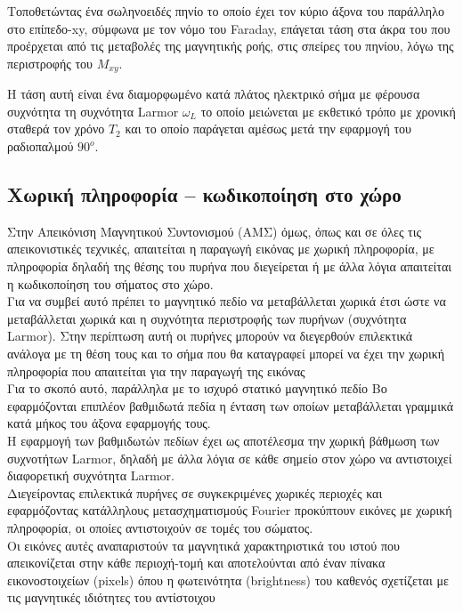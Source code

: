 \documentclass{article}
\begin{document}
    Τοποθετώντας	 ένα	 σωληνοειδές	 πηνίο	 το	 οποίο	 έχει	 τον	 κύριο	 άξονα	 του	
παράλληλο	 στο	 επίπεδο-xy,	 	 σύμφωνα	 με	 τον	 νόμο	 του	 Faraday,	 επάγεται	
τάση	στα	άκρα	 του	που	προέρχεται	από	 τις	μεταβολές	 της	μαγνητικής	 ροής,	
στις	σπείρες	του	πηνίου,	λόγω	της	περιστροφής	του	$M_{xy}$.

Η	 τάση	 αυτή	 είναι	 ένα	 διαμορφωμένο	 κατά	 πλάτος	 ηλεκτρικό	 σήμα	 με	
φέρουσα	συχνότητα	τη	συχνότητα	Larmor	$ω_L$	το	οποίο	μειώνεται	με	εκθετικό	
τρόπο	με	χρονική	σταθερά	τον	χρόνο	$Τ_2$	και	το	οποίο	παράγεται	αμέσως	μετά	
την	εφαρμογή	του	ραδιοπαλμού	$90^{ο}$.	
\subsection{Χωρική	πληροφορία	–	κωδικοποίηση	στο	χώρο	}
Στην	Απεικόνιση	Μαγνητικού	Συντονισμού	(ΑΜΣ)	όμως,	όπως	και	
σε	 όλες	 τις	 απεικονιστικές	 τεχνικές,	 απαιτείται	 η	 παραγωγή	
εικόνας	 με	 χωρική	 πληροφορία,	 με	 πληροφορία	 δηλαδή	 της	
θέσης	του	πυρήνα	που	διεγείρεται	ή	με	άλλα	λόγια	απαιτείται	η	
κωδικοποίηση	του	σήματος	στο	χώρο.	\\
Για	να	συμβεί	αυτό	πρέπει	το	μαγνητικό	πεδίο	να	μεταβάλλεται	
χωρικά	 έτσι	 ώστε	 να	 μεταβάλλεται	 χωρικά	 και	 η	 συχνότητα	
περιστροφής	 των	πυρήνων	 (συχνότητα	Larmor).	Στην	περίπτωση	
αυτή	οι	πυρήνες	μπορούν	να	διεγερθούν	επιλεκτικά	ανάλογα	με	
τη	θέση	τους	και	το	σήμα	που	θα	καταγραφεί	μπορεί	να	έχει	την	
χωρική	 πληροφορία	 που	 απαιτείται	 για	 την	 παραγωγή	 της	
εικόνας \\
Για	 το	 σκοπό	 αυτό,	 παράλληλα	 με	 το	 ισχυρό	
στατικό	 μαγνητικό	 πεδίο	 Βο	 εφαρμόζονται	
επιπλέον	 βαθμιδωτά	 πεδία	 η	 ένταση	 των	
οποίων	 μεταβάλλεται	 γραμμικά	 κατά	 μήκος	
του	άξονα	εφαρμογής	τους.	\\
H	 εφαρμογή	 των	 βαθμιδωτών	 πεδίων	
έχει	 ως	 αποτέλεσμα	 την	 χωρική	
βάθμωση	 των	 συχνοτήτων	 Larmor,	
δηλαδή	με	άλλα	λόγια	σε	κάθε	σημείο	
στον	 χώρο	 να	 αντιστοιχεί	 διαφορετική	
συχνότητα	Larmor.	\\
Διεγείροντας	 επιλεκτικά	 πυρήνες	 σε	 συγκεκριμένες	 χωρικές	 περιοχές	
και	εφαρμόζοντας	κατάλληλους	μετασχηματισμούς	Fourier	προκύπτουν	
εικόνες	 με	 χωρική	 πληροφορία,	 οι	 οποίες	 αντιστοιχούν	 σε	 τομές	 του	
σώματος.	\\
Οι	εικόνες	αυτές	αναπαριστούν	τα	μαγνητικά	χαρακτηριστικά	του	ιστού	
που	απεικονίζεται	στην	κάθε	περιοχή-τομή	και	αποτελούνται	από	έναν	
πίνακα	 εικονοστοιχείων	 (pixels)	 όπου	 η	 φωτεινότητα	 (brightness)	 του	
καθενός	 σχετίζεται	 με	 τις	 μαγνητικές	 ιδιότητες	 του	 αντίστοιχου	
\end{document}
